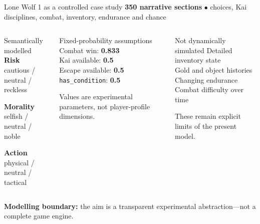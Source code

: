 \documentclass[10pt,aspectratio=169]{beamer}
\begin{document}
\begin{frame}{Lone Wolf 1 as a controlled case study}
  \centering
  \small\textbf{350 narrative sections} \quad $\bullet$ \quad choices, Kai disciplines,
  combat, inventory, endurance and chance

  \vspace{2mm}
  \begin{columns}[T,onlytextwidth]
      \begin{block}{Semantically modelled}
        \footnotesize
        \textcolor{riskcolor}{\textbf{Risk}}\\
        cautious / neutral / reckless

        \smallskip
        \textcolor{moralitycolor}{\textbf{Morality}}\\
        selfish / neutral / noble

        \smallskip
        \textcolor{actioncolor}{\textbf{Action}}\\
        physical / neutral / tactical
      \end{block}

      \begin{block}{Fixed-probability assumptions}
        \footnotesize
        Combat win: \textbf{0.833}\\[1mm]
        Kai available: \textbf{0.5}\\[1mm]
        Escape available: \textbf{0.5}\\[1mm]
        \texttt{has\_condition}: \textbf{0.5}

        \smallskip
        Values are experimental parameters, not player-profile dimensions.
      \end{block}

      \begin{block}{Not dynamically simulated}
        \footnotesize
        Detailed inventory state\\[1mm]
        Gold and object histories\\[1mm]
        Changing endurance\\[1mm]
        Combat difficulty over time

        \smallskip
        These remain explicit limits of the present model.
      \end{block}
  \end{columns}

  \vspace{1mm}
  \small\color{warncolor}\textbf{Modelling boundary:}
  the aim is a transparent experimental abstraction---not a complete game engine.
\end{frame}
\end{document}
